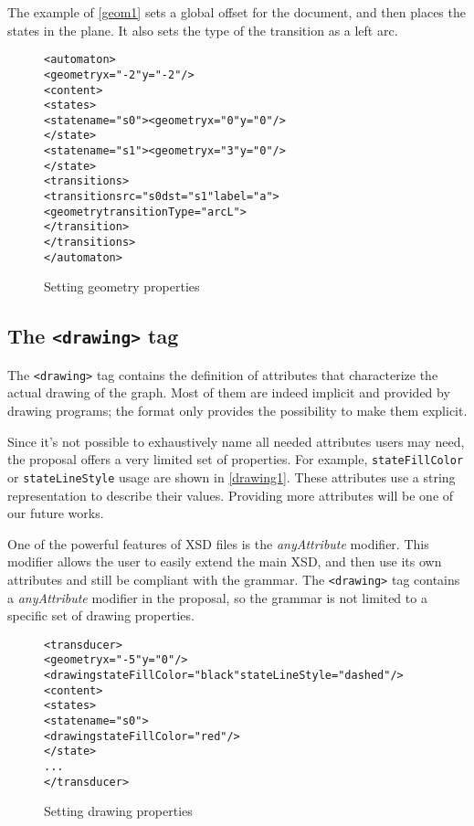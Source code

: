 \documentclass[a4paper]{article}
\newcommand{\xtag}[1]{\texttt{<#1>}}
\newcommand{\xattr}[1]{\texttt{#1}}
\begin{document}
The example of \autoref{geom1} sets a global offset for the document,
and then places the states in the plane.  It also sets the type of the
transition as a left arc.

\begin{figure}[htp]
  \small
  \begin{center}
\begin{alltt}
<automaton>
  <geometry x="-2" y="-2"/>
  <content>
     <states>
        <state name="s0"><geometry x="0" y="0"/>
        </state>
        <state name="s1"><geometry x="3" y="0"/>
        </state>
     <transitions>
        <transition \xattr{src}="s0 \xattr{dst}="s1" label="a">
          <geometry transitionType="arcL">
        </transition>
     </transitions>
</automaton>
\end{alltt}

\caption{Setting geometry properties}
\label{geom1}
  \end{center}
\end{figure}


\subsection{The \xtag{drawing} tag}

The \xtag{drawing} tag contains the definition of attributes that
characterize the actual drawing of the graph.  Most of them are indeed
implicit and provided by drawing programs; the format only provides
the possibility to make them explicit.

Since it's not possible to exhaustively name all needed attributes
users may need, the proposal offers a very limited set of properties. For
example, \xattr{stateFillColor} or \xattr{stateLineStyle} usage are
shown in \autoref{drawing1}. These attributes use a string representation to
describe their values. Providing more attributes will be one of our future
works.

One of the powerful features of XSD files is the \textit{anyAttribute}
modifier. This modifier allows the user to easily extend the main XSD,
and then use its own attributes and still be compliant with the
grammar. The \xtag{drawing} tag contains a \textit{anyAttribute}
modifier in the proposal, so the grammar is not limited to a specific
set of drawing properties.

\begin{figure}[ht]
  \small
  \begin{center}
\begin{alltt}
<transducer>
  <geometry x="-5" y="0"/>
  <drawing stateFillColor="black" stateLineStyle="dashed"/>
  <content>
     <states>
        <state name="s0">
            <drawing stateFillColor="red"/>
        </state>
      ...
</transducer>
\end{alltt}

\caption{Setting drawing properties}
\label{drawing1}
  \end{center}
\end{figure}
\end{document}
